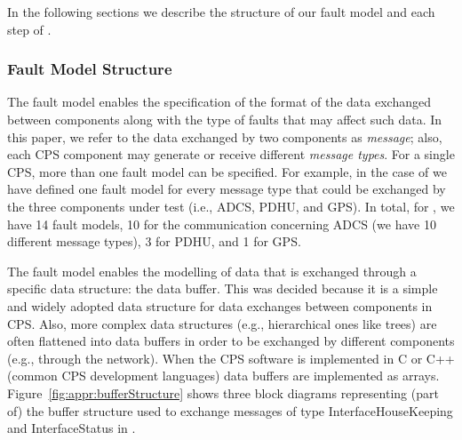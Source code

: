 
In the following sections we describe the structure of our fault model and each step of \APPR.



\subsubsection{Fault Model Structure}
\label{sec:faultModelStructure}





The \APPR fault model enables the specification of the format of the data exchanged between components along with the type of faults that may affect such data. 
In this paper, we refer to the data exchanged by two components as \emph{message}; also, each CPS component may generate or receive different \emph{message types}.
For a single CPS, more than one fault model can be specified. For example, in the case of \ESAIL{} we have defined one fault model for every message type that could be exchanged by the three components under test (i.e., ADCS, PDHU, and GPS). In total, for \ESAIL, we have 14 fault models, 10 for the communication concerning ADCS (we have 10 different message types), 3 for PDHU, and 1 for GPS.

The \APPR fault model enables the modelling of data that is exchanged through a specific data structure: the data buffer. This was decided because it is a simple and widely adopted data structure for data exchanges between components in CPS. Also, more complex data structures (e.g., hierarchical ones like trees) are often flattened into data buffers in order to be exchanged by different components (e.g., through the network). When the CPS software is implemented in C or C++ (common CPS development languages) data buffers are implemented as arrays. Figure~\ref{fig:appr:bufferStructure} shows three block diagrams representing (part of) the buffer structure used to exchange messages of type InterfaceHouseKeeping and InterfaceStatus in \ESAIL.

